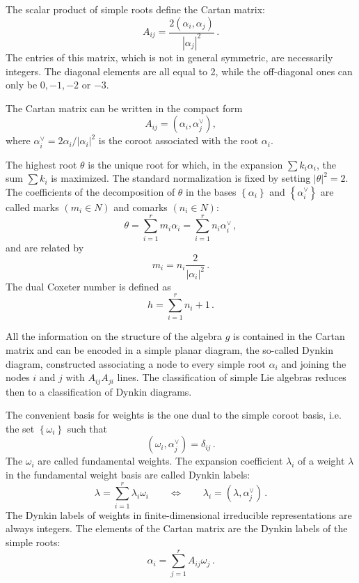 \documentclass[a4paper,12pt]{report}
\begin{document}
The scalar product of simple roots define the Cartan matrix:
\begin{equation}
A_{ij}=\frac{2\left(\alpha_{i},\alpha_{j}\right)}{|\alpha_{j}|^{2}}\,.
\end{equation}
The entries of this matrix, which is not in general symmetric, are necessarily integers. The diagonal elements are
all equal to 2, while the off-diagonal ones can only be $0,-1,-2$ or $-3$.

The Cartan matrix can be written in the compact form
\begin{equation}
A_{ij}=\left(\alpha_{i},\alpha_{j}^{\vee}\right),
\end{equation}
where $\alpha_{i}^{\vee}=2\alpha_{i}/|\alpha_{i}|^{2}$ is the coroot associated with the root $\alpha_{i}$.


The highest root $\theta$ is the unique root for which, in the expansion $\sum k_{i}\alpha_{i}$, the sum $\sum
k_{i}$ is maximized. The standard normalization is fixed by setting $|\theta|^{2}=2$. The coefficients of the
decomposition of $\theta$ in the bases $\left\{\alpha_{i}\right\}$ and $\left\{\alpha_{i}^{\vee}\right\}$ are
called marks $\left(m_{i}\in N\right)$ and comarks $\left(n_{i}\in N\right)$:
\begin{equation}
\theta=\sum_{i=1}^{r}m_{i}\alpha_{i}=\sum_{i=1}^{r}n_{i}\alpha_{i}^{\vee}\,,
\end{equation}
and are related by
\begin{equation}
m_{i}=n_{i}\frac{2}{|\alpha_{i}|^{2}}\,.
\end{equation}
The dual Coxeter number is defined as
\begin{equation}
h=\sum_{i=1}^{r}n_{i}+1\,.
\end{equation}

All the information on the structure of the algebra $g$ is contained in the Cartan matrix and can be encoded in a
simple planar diagram, the so-called Dynkin diagram, constructed associating a node to every simple root
$\alpha_{i}$ and joining the nodes $i$ and $j$ with $A_{ij}A_{ji}$ lines. The classification of simple Lie
algebras reduces then to a classification of Dynkin diagrams.

The convenient basis for weights is the one dual to the simple coroot basis, i.e. the set
$\left\{\omega_{i}\right\}$ such that
\begin{equation}
\left(\omega_{i},\alpha_{j}^{\vee}\right)=\delta_{ij}\,.
\end{equation}
The $\omega_{i}$ are called fundamental weights. The expansion coefficient $\lambda_{i}$ of a weight $\lambda$ in
the fundamental weight basis are called Dynkin labels:
\begin{equation}
\lambda=\sum_{i=1}^{r}\lambda_{i}\omega_{i}\qquad\Longleftrightarrow\qquad\lambda_{i}=\left(\lambda,\alpha_{j}^{\vee}\right)\,.
\end{equation}
The Dynkin labels of weights in finite-dimensional irreducible representations are always integers. The elements
of the Cartan matrix are the Dynkin labels of the simple roots:
\begin{equation}
\alpha_{i}=\sum_{j=1}^{r}A_{ij}\omega_{j}\,.
\end{equation}
\end{document}
